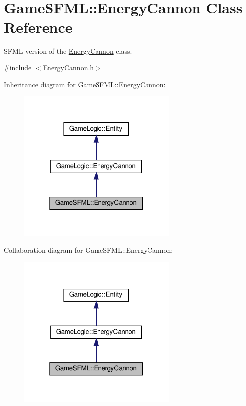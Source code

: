 \hypertarget{classGameSFML_1_1EnergyCannon}{}\section{Game\+S\+F\+ML\+:\+:Energy\+Cannon Class Reference}
\label{classGameSFML_1_1EnergyCannon}


S\+F\+ML version of the \hyperlink{classGameSFML_1_1EnergyCannon}{Energy\+Cannon} class.  




{\ttfamily \#include $<$Energy\+Cannon.\+h$>$}



Inheritance diagram for Game\+S\+F\+ML\+:\+:Energy\+Cannon\+:
\nopagebreak
\begin{figure}[H]
\begin{center}
\leavevmode
\includegraphics[width=220pt]{classGameSFML_1_1EnergyCannon__inherit__graph}
\end{center}
\end{figure}


Collaboration diagram for Game\+S\+F\+ML\+:\+:Energy\+Cannon\+:
\nopagebreak
\begin{figure}[H]
\begin{center}
\leavevmode
\includegraphics[width=220pt]{classGameSFML_1_1EnergyCannon__coll__graph}
\end{center}
\end{figure}
